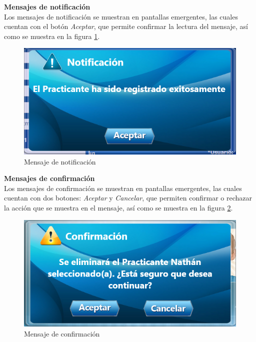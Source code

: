 \textbf{\textcolor[rgb]{0, 0, 0.545098}{Mensajes de notificación}} \\

Los mensajes de notificación se muestran en pantallas emergentes, las cuales cuentan con el botón \textit{Aceptar}, que permite confirmar la lectura del mensaje, así como se muestra en la figura \ref{dm:MN}. \\

\begin{figure}[H]
	\centering
		\includegraphics[scale=0.5]{./Figuras/Diseno_mensajes/Mensaje_notificacion}
	\caption{Mensaje de notificación}
	\label{dm:MN}
\end{figure}

\textbf{\textcolor[rgb]{0, 0, 0.545098}{Mensajes de confirmación}} \\

Los mensajes de confirmación se muestran en pantallas emergentes, las cuales cuentan con dos botones: \textit{Aceptar} y \textit{Cancelar}, que permiten confirmar o rechazar la acción que se muestra en el mensaje, así como se muestra en la figura \ref{dm:MC}. \\

\begin{figure}[H]
	\centering
		\includegraphics[scale=0.5]{./Figuras/Diseno_mensajes/Mensaje_confirmacion}
	\caption{Mensaje de confirmación}
	\label{dm:MC}
\end{figure}


